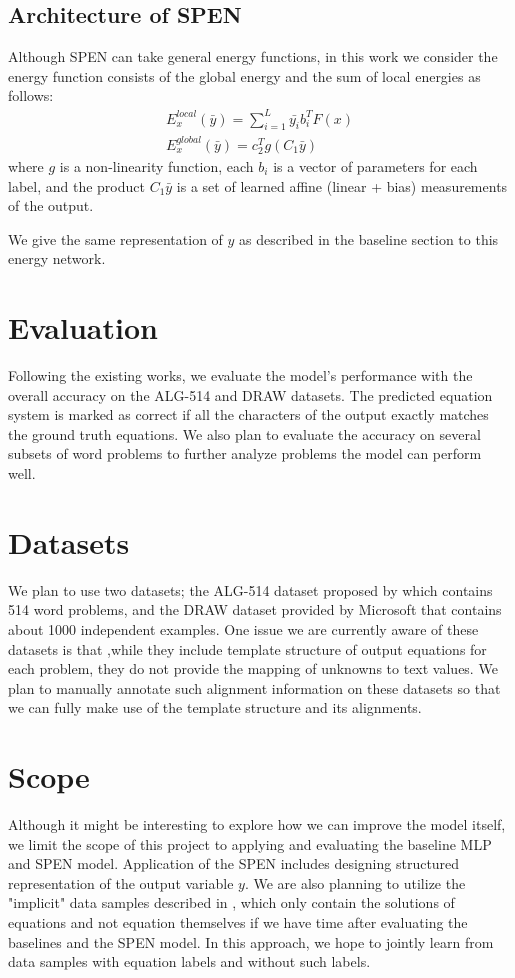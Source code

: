 \documentclass[11pt,letterpaper]{article}
\begin{document}
\subsection{Architecture of SPEN}
Although SPEN can take general energy functions, in this work we consider the energy function consists of the global energy and the sum of local energies as follows:
\begin{align}
E_x^{local}(\bar{y}) = \sum^L_{i=1} \bar{y_i} b_i^T F(x) \\
E_x^{global}(\bar{y}) = c_2^T g(C_1 \bar{y})
\end{align}
where $g$ is a non-linearity function, each $b_i$ is a vector of parameters for each label, and the product $C_1 \bar{y}$ is a set of learned affine (linear + bias)
measurements of the output.

We give the same representation of $y$ as described in the baseline section to this energy network.
\section{Evaluation}
Following the existing works, we evaluate the model's performance with the overall accuracy on the ALG-514 and DRAW datasets. The predicted equation system is marked as correct if all the characters of the output exactly matches the ground truth equations. We also plan to evaluate the accuracy on several subsets of word problems to further analyze problems the model can perform well.
\section{Datasets}
We plan to use two datasets; the ALG-514 dataset proposed by \cite{Kushman2014LearningTA} which contains 514 word problems, and the DRAW dataset provided by Microsoft that contains about 1000 independent examples. One issue we are currently aware of these datasets is that ,while they include template structure of output equations for each problem, they do not provide the mapping of unknowns to text values. We plan to manually annotate such alignment information on these datasets so that we can fully make use of the template structure and its alignments.
\section{Scope}
Although it might be interesting to explore how we can improve the model itself, we limit the scope of this project to applying and evaluating the baseline MLP and SPEN model. Application of the SPEN includes designing structured representation of the output variable $y$. We are also planning to utilize the "implicit" data samples described in \cite{UpChChYi16}, which only contain the solutions of equations and not equation themselves if we have time after evaluating the baselines and the SPEN model. In this approach, we hope to jointly learn from data samples with equation labels and without such labels.
%
\nocite{*}


\end{document}
